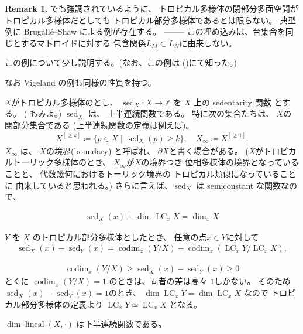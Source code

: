 \documentclass[a4paper,dvipdfmx,reqno,12pt]{amsart}
\theoremstyle{definition}
\newtheorem{remark}[theorem]{Remark}
\newcommand{\deq}{\coloneqq}
\newcommand{\opn}[1]{\operatorname{#1}}
\numberwithin{equation}{section}
\begin{document}
\begin{remark}
\cite[Example 2.15]{demedrano2023chern}でも強調されているように、
トロピカル多様体の閉部分多面空間がトロピカル多様体だとしても
トロピカル部分多様体であるとは限らない。
典型例に Brugall\'e--Shaw による例が存在する。
--------
この埋め込みは、台集合を同じとするマトロイドに対する
包含関係$L_M\subset L_N$に由来しない。

この例について少し説明する。(なお、この例は
()にて知った。)

なお Vigeland の例も同様の性質を持つ。
\end{remark}
$X$がトロピカル多様体のとし、
$\opn{sed}_X\colon 
X\to \mathbb{Z}$ を
$X$ 上の sedentarity 関数
\cite[Definition 7.2.6]{mikhalkin2018tropical}
とする。
(\cite[Definition 2.4]{demedrano2023chern}
もみよ。)
$\opn{sed}_X$ は、
上半連続関数である。
特に次の集合たちは、
$X$の閉部分集合である
(上半連続関数の定義は例えば\cite[p.287]{MR463157})。
\begin{align}
X^{[\geq k]}\deq \{p\in X\mid \opn{sed}_X(p)\geq k\},
\quad 
X_{\infty}\deq X^{[\geq 1]}.
\end{align}
$X_{\infty}$ は、
$X$の境界(boundary)
と呼ばれ、
$\partial X$と書く場合がある。
($X$がトロピカルトーリック多様体のとき、
$X_{\infty}$が$X$の境界つき
位相多様体の境界となっていることと、
代数幾何におけるトーリック境界の
トロピカル類似になっていることに
由来していると思われる。)
さらに言えば、$\opn{sed}_X$ は
semiconstant な関数なので、

\begin{align}
     \opn{sed}_X(x)+\dim \opn{LC}_x X=\dim_x X
\end{align}


$Y$ を $X$ 
のトロピカル部分多様体としたとき、
任意の点$x\in Y$に対して
\begin{align}
\opn{sed}_X(x)-\opn{sed}_Y(x)
=\opn{codim}_x(Y/X)-\opn{codim}_x(\opn{LC}_x Y/\opn{LC}_xX),
\end{align}

\begin{align}
\opn{codim}_x(Y/X) \geq 
\opn{sed}_X(x)-\opn{sed}_Y(x)\geq 0
\end{align}
とくに $\opn{codim}_x(Y/X)=1$
のときは、両者の差は高々
$1$しかない。
そのため
$\opn{sed}_X(x)-\opn{sed}_Y(x)=1$のとき、
$\dim \opn{LC}_x Y=\dim \opn{LC}_x X$
なので トロピカル部分多様体の定義より
$\opn{LC}_x Y\simeq \opn{LC}_x X$
となる。



$\dim \opn{lineal}(X,\cdot)$
は下半連続関数である。
\end{document}
